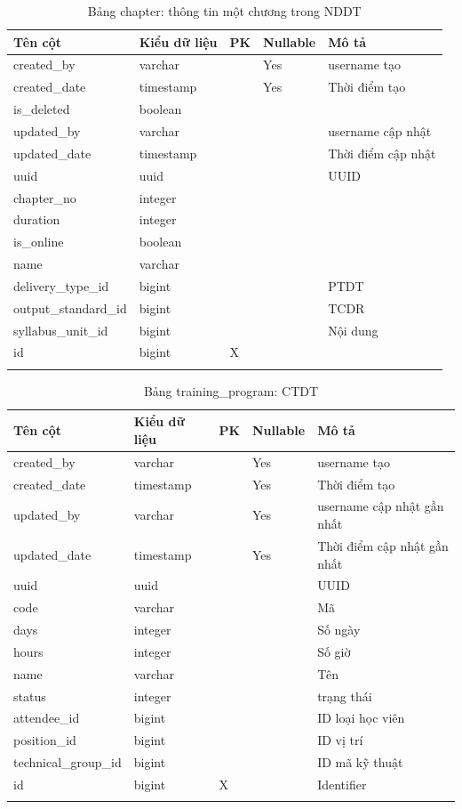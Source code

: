 \documentclass[report.tex]{subfiles}
\begin{document}
\pagebreak %

\begin{table}[!htb]
\begin{longtable}{|p{3cm}|p{3cm}|p{1cm}|p{1.6cm}|p{6cm}|}
\hline
\textbf{Tên cột} & \textbf{Kiểu dữ liệu} & \textbf{PK} & \textbf{Nullable} & \textbf{Mô tả} \\
\hline
created\_by & varchar & & Yes & username tạo \\
created\_date & timestamp & & Yes & Thời điểm tạo \\
is\_deleted & boolean & & & \\
updated\_by & varchar & & & username cập nhật \\
updated\_date & timestamp & & & Thời điểm cập nhật \\
uuid & uuid & & & UUID \\
chapter\_no & integer & & & \\
duration & integer & & & \\
is\_online & boolean & & & \\
name & varchar & & & \\
delivery\_type\_id & bigint & & & PTDT \\
output\_standard\_id & bigint & & & TCDR \\
syllabus\_unit\_id & bigint & & & Nội dung \\
id & bigint & X & & \\
\hline
\caption[Bảng chapter]{Bảng chapter: thông tin một chương trong NDDT}
\end{longtable}
\end{table}
\FloatBarrier

\begin{table}[!htb]
\begin{longtable}{|p{3cm}|p{3cm}|p{1cm}|p{1.6cm}|p{6cm}|}
\hline
\textbf{Tên cột} & \textbf{Kiểu dữ liệu} & \textbf{PK} & \textbf{Nullable} & \textbf{Mô tả} \\
\hline
created\_by & varchar & & Yes & username tạo \\
created\_date & timestamp & & Yes & Thời điểm tạo \\
updated\_by & varchar & & Yes & username cập nhật gần nhất \\
updated\_date & timestamp & & Yes & Thời điểm cập nhật gần nhất \\
uuid & uuid & & & UUID \\
code & varchar & & & Mã \\
days & integer & & & Số ngày \\
hours & integer & & & Số giờ \\
name & varchar & & & Tên \\
status & integer & & & trạng thái \\
attendee\_id & bigint & & & ID loại học viên \\
position\_id & bigint & & & ID vị trí \\
technical\_group\_id & bigint & & & ID mã kỹ thuật \\
id & bigint & X & & Identifier \\
\hline
\caption[Bảng training\_program]{Bảng training\_program: CTDT}
\end{longtable}
\end{table}
\FloatBarrier
\end{document}
